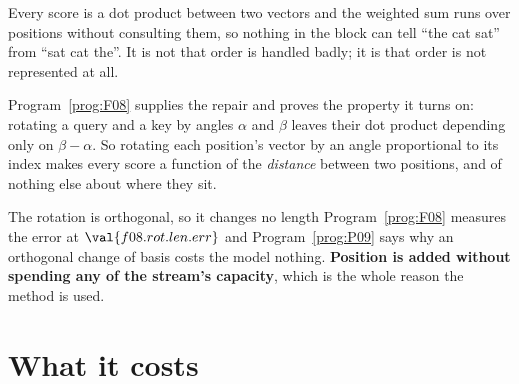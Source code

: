 \begin{fr}

Every score is a dot product between two vectors and the weighted sum runs
over positions without consulting them, so nothing in the block can tell
\enquote{the cat sat} from \enquote{sat cat the}. It is not that order is
handled badly; it is that order is not represented at all.

Program~\ref{prog:F08} supplies the repair and proves the property it turns
on: rotating a query and a key by angles $\alpha$ and $\beta$ leaves their
dot product depending only on $\beta - \alpha$. So rotating each position's
vector by an angle proportional to its index makes every score a function of
the \emph{distance} between two positions, and of nothing else about where
they sit.

The rotation is orthogonal, so it changes no length \dash{}
Program~\ref{prog:F08} measures the error at $\val{f08.rot.len.err}$ and
Program~\ref{prog:P09} says why an orthogonal change of basis costs the
model nothing. \textbf{Position is added without spending any of the
stream's capacity}, which is the whole reason the method is used.
\end{fr}

\section{What it costs}
\label{sec:P32-count}

